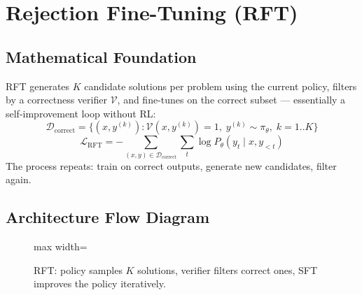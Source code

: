 \newpage
\section{Rejection Fine-Tuning (RFT)}

\subsection{Mathematical Foundation}
RFT generates $K$ candidate solutions per problem using the current policy, filters by a correctness verifier $\mathcal{V}$, and fine-tunes on the correct subset — essentially a self-improvement loop without RL:
\begin{equation}
  \mathcal{D}_{\text{correct}} = \{(x, y^{(k)}) : \mathcal{V}(x, y^{(k)}) = 1,\; y^{(k)} \sim \pi_\theta,\; k=1..K\}
\end{equation}
\begin{equation}
  \mathcal{L}_{\text{RFT}} = -\sum_{(x,y) \in \mathcal{D}_{\text{correct}}} \sum_t \log P_\theta(y_t \mid x, y_{<t})
\end{equation}
The process repeats: train on correct outputs, generate new candidates, filter again.

\subsection{Architecture Flow Diagram}

\begin{figure}[h]
\centering
\begin{adjustbox}{max width=\linewidth}
\end{adjustbox}
\caption{RFT: policy samples $K$ solutions, verifier filters correct ones, SFT improves the policy iteratively.}
\end{figure}

